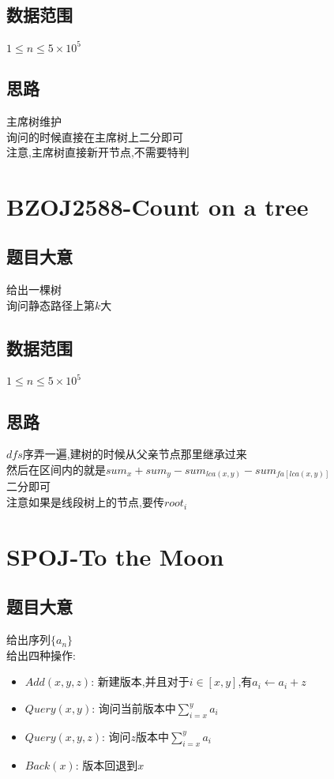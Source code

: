 \documentclass{ctexart}
\numberwithin{equation}{section}
\begin{document}
\begin{flushleft}
  \subsection{数据范围}
  $1\le n\le 5\times 10^5$\\
  \subsection{思路}
  主席树维护\\
  询问的时候直接在主席树上二分即可\\
  注意,主席树直接新开节点,不需要特判\\
  \newpage

  \section{BZOJ2588-Count on a tree}
  \subsection{题目大意}
  给出一棵树\\
  询问静态路径上第$k$大\\
  \subsection{数据范围}
  $1\le n\le 5\times 10^5$\\
  \subsection{思路}
  $dfs$序弄一遍,建树的时候从父亲节点那里继承过来\\
  然后在区间内的就是$sum_x+sum_y-sum_{lca(x,y)}-sum_{fa[lca(x,y)]}$\\
  二分即可\\
  注意如果是线段树上的节点,要传$root_i$\\
  \newpage

  \section{SPOJ-To the Moon}
  \subsection{题目大意}
  给出序列$\{a_n\}$\\
  给出四种操作:\\
  \begin{itemize}
  \item $Add(x,y,z)$: 新建版本,并且对于$i\in[x,y]$,有$a_i\leftarrow a_i+z$
  \item $Query(x,y)$: 询问当前版本中$\sum_{i=x}^y a_i$
  \item $Query(x,y,z)$: 询问$z$版本中$\sum_{i=x}^y a_i$
  \item $Back(x)$: 版本回退到$x$
  \end{itemize}

\end{flushleft}
\end{document}
